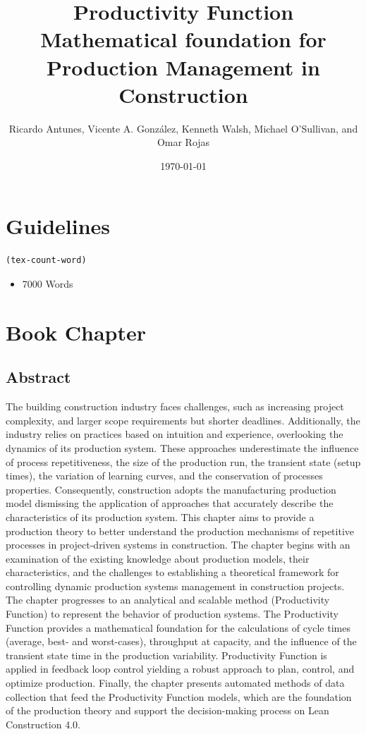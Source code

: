 \documentclass{article}
\author{Ricardo Antunes, Vicente A. González, Kenneth Walsh, Michael O'Sullivan, and Omar Rojas}
\date{\today}
\title{Productivity Function\\\medskip
\large Mathematical foundation for Production Management in Construction}
\begin{document}
\maketitle
\tableofcontents



\section{Guidelines}
\label{sec:org66ee537}
\begin{verbatim}
(tex-count-word)
\end{verbatim}
\begin{itemize}
\item 7000 Words
\end{itemize}
\section{Book Chapter}
\label{sec:orgf1f2594}
\subsection{Abstract}
\label{sec:org1738478}
The building construction industry faces challenges, such as increasing project complexity, and larger scope requirements but shorter deadlines. 
Additionally, the industry relies on practices based on intuition and experience, overlooking the dynamics of its production system. 
These approaches underestimate the influence of process repetitiveness, the size of the production run, the transient state (setup times), the variation of learning curves, and the conservation of processes properties. 
Consequently, construction adopts the manufacturing production model dismissing the application of approaches that accurately describe the characteristics of its production system. 
This chapter aims to provide a production theory to better understand the production mechanisms of repetitive processes in project-driven systems in construction.
The chapter begins with an examination of the existing knowledge about production models, their characteristics, and the challenges to establishing a theoretical framework for controlling dynamic production systems management in construction projects. 
The chapter progresses to an analytical and scalable method (Productivity Function) to represent the behavior of production systems. 
The Productivity Function provides a mathematical foundation for the calculations of cycle times (average, best- and worst-cases), throughput at capacity, and the influence of the transient state time in the production variability. 
Productivity Function is applied in feedback loop control yielding a robust approach to plan, control, and optimize production.
Finally, the chapter presents automated methods of data collection that feed the Productivity Function models, which are the foundation of the production theory and support the decision-making process on Lean Construction 4.0. 
\end{document}

